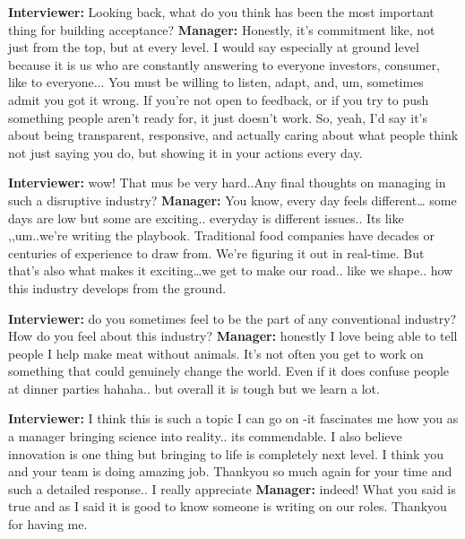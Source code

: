 \textbf{Interviewer:} Looking back, what do you think has been the most important thing for building acceptance? \newline
\textbf{Manager:} Honestly, it's commitment like, not just from the top, but at every level. I would say especially at ground level because it is us who are constantly answering to everyone investors, consumer, like to everyone... You must be willing to listen, adapt, and, um, sometimes admit you got it wrong. If you're not open to feedback, or if you try to push something people aren't ready for, it just doesn't work. So, yeah, I'd say it's about being transparent, responsive, and actually caring about what people think not just saying you do, but showing it in your actions every day. \newline

\textbf{Interviewer:} wow! That mus be very hard..Any final thoughts on managing in such a disruptive industry? \newline
\textbf{Manager:} You know, every day feels different… some days are low but some are exciting.. everyday is different issues.. Its like ,,um..we're writing the playbook. Traditional food companies have decades or centuries of experience to draw from. We're figuring it out in real-time. But that's also what makes it exciting…we get to make our road.. like we shape.. how this industry develops from the ground. \newline

\textbf{Interviewer:} do you sometimes feel to be the part of any conventional industry? How do you feel about this industry?
\textbf{Manager:} honestly  I love being able to tell people I help make meat without animals. It's not often you get to work on something that could genuinely change the world. Even if it does confuse people at dinner parties hahaha.. but overall it is tough but we learn a lot.  \newline

\textbf{Interviewer:} I think this is such a topic I can go on -it fascinates me how you as a manager bringing science into reality.. its commendable. I also believe innovation is one thing but bringing to life is completely next level. I think you and your team is doing amazing job. Thankyou so much again for your time and such a detailed response.. I really appreciate
\textbf{Manager:} indeed! What you said is true and as I said it is good to know someone is writing on our roles. Thankyou for having me. \newline